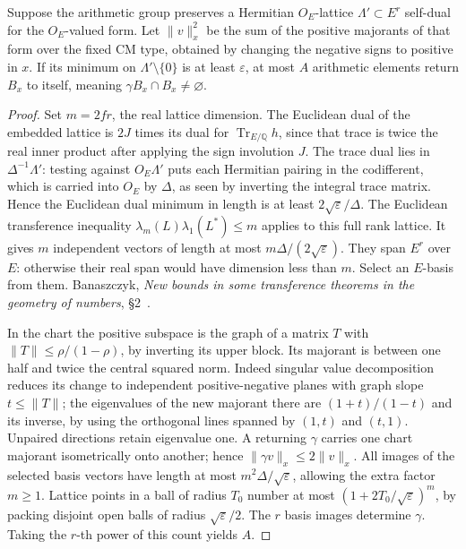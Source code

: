 \begin{lemma}\label{bergvol:returns}
Suppose the arithmetic group preserves a Hermitian \(O_E\)-lattice
\(\Lambda'\subset E^r\) self-dual for the \(O_E\)-valued form.
Let \(\|v\|_x^2\) be the sum of the positive majorants of that form
over the fixed CM type, obtained by changing the negative signs to
positive in \(x\). If its minimum on \(\Lambda'\setminus\{0\}\)
is at least \(\varepsilon\), at most \(A\) arithmetic elements
return \(B_x\) to itself, meaning \(\gamma B_x\cap B_x\ne\varnothing\).
\end{lemma}
\begin{proof}
Set \(m=2fr\), the real lattice dimension. The Euclidean dual of the
embedded lattice is \(2J\) times its dual for
\(\operatorname{Tr}_{E/\mathbb Q}h\), since that trace is twice
the real inner product after applying the sign involution \(J\).
The trace dual lies in \(\Delta^{-1}\Lambda'\): testing against
\(O_E\Lambda'\) puts each Hermitian pairing in the codifferent,
which is carried into \(O_E\) by \(\Delta\), as seen by inverting
the integral trace matrix. Hence the Euclidean dual minimum in length
is at least \(2\sqrt\varepsilon/\Delta\).
The Euclidean transference inequality
\(\lambda_m(L)\lambda_1(L^*)\le m\) applies to this full rank lattice.
It gives \(m\) independent vectors of length at most
\(m\Delta/(2\sqrt\varepsilon)\). They span \(E^r\) over \(E\):
otherwise their real span would have dimension less than \(m\).
Select an \(E\)-basis from them.
Banaszczyk,
\emph{New bounds in some transference theorems in the geometry of numbers},
\S2~\cite{banaszczyk}.

In the chart the positive subspace is the graph of a matrix \(T\)
with \(\|T\|\le\rho/(1-\rho)\), by inverting its upper block.
Its majorant is between one half and twice the central squared norm.
Indeed singular value decomposition reduces its change to independent
positive-negative planes with graph slope \(t\le\|T\|\); the
eigenvalues of the new majorant there are
\((1+t)/(1-t)\) and its inverse, by using the orthogonal lines
spanned by \((1,t)\) and \((t,1)\). Unpaired directions retain
eigenvalue one. A returning \(\gamma\) carries one chart majorant
isometrically onto another; hence \(\|\gamma v\|_x\le2\|v\|_x\).
All images of the selected basis vectors have length at most
\(m^2\Delta/\sqrt\varepsilon\), allowing the extra factor \(m\ge1\).
Lattice points in a ball of radius \(T_0\) number at most
\((1+2T_0/\sqrt\varepsilon)^m\), by packing disjoint open balls of
radius \(\sqrt\varepsilon/2\). The \(r\) basis images determine
\(\gamma\). Taking the \(r\)-th power of this count yields \(A\).
\end{proof}

